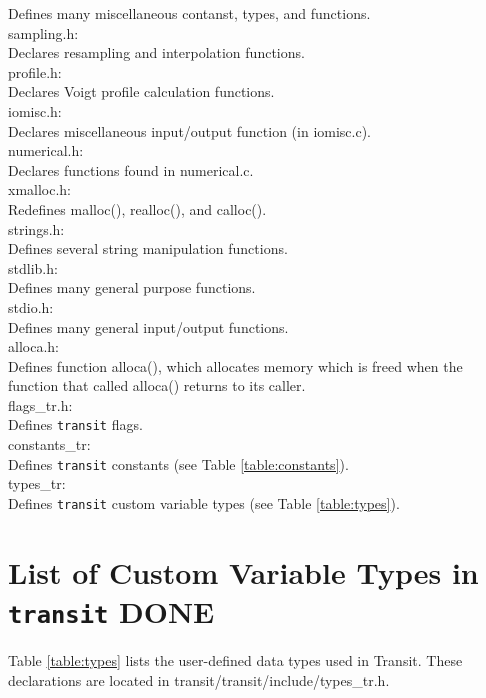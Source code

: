 \documentclass[letterpaper,12pt]{article}
\begin{document}
\indent Defines many miscellaneous contanst, types, and functions.\\
sampling.h: \\
\indent Declares resampling and interpolation functions.\\
profile.h: \\
\indent Declares Voigt profile calculation functions.\\
iomisc.h: \\
\indent Declares miscellaneous input/output function (in iomisc.c). \\
numerical.h: \\
\indent Declares functions found in numerical.c. \\
xmalloc.h: \\
\indent Redefines malloc(), realloc(), and calloc(). \\
strings.h: \\
\indent Defines several string manipulation functions. \\
stdlib.h: \\
\indent Defines many general purpose functions. \\
stdio.h: \\
\indent Defines many general input/output functions. \\
alloca.h: \\
\indent Defines function alloca(), which allocates memory which is freed when the function that called alloca() returns to its caller. \\
flags\_tr.h: \\
\indent Defines {\tt transit} flags. \\
constants\_tr: \\
\indent Defines {\tt transit} constants (see Table \ref{table:constants}). \\
types\_tr: \\
\indent Defines {\tt transit} custom variable types (see Table \ref{table:types}). \\

	
\section{List of Custom Variable Types in \texttt{transit} DONE}
\label{sec:variables}
Table \ref{table:types} lists the user-defined data types used in
Transit.  These declarations are located in
transit/transit/include/types\_tr.h.
\end{document}
